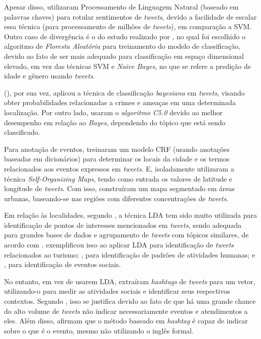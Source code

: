 \documentclass[
	12pt,				%
	oneside,			%
	a4paper,			%
	english,			%
	brazil				%
	]{abntex2ppgsi}
\begin{document}
{{{Apesar disso, \cite{Guo2016} utilizaram Processamento de Linguagem Natural (baseado em palavras chaves) para rotular sentimentos de \textit{tweets}, devido a facilidade de escalar essa técnica (para processamento de milhões de \textit{tweets}), em comparação a SVM. Outro caso de divergência é o do estudo realizado por \cite{Farseev2015}, no qual foi escolhido o algoritmo de \textit{Floresta Aleatória} para treinamento do modelo de classificação, devido ao fato de ser mais adequado para classificação em espaço dimensional elevado, em vez das técnicas SVM e \textit{Naive Bayes}, no que se refere a predição de idade e gênero usando \textit{tweets}.

\citeauthor{Mata2015} (\citeyear{Mata2015}), por sua vez, aplicou a técnica de classificação \textit{bayesiana} em \textit{tweets}, visando obter probabilidades relacionadas a crimes e ameaças em uma determinada localização. Por outro lado, \cite{Zagal2016} usaram o \textit{algoritmo C5.0} devido ao melhor desempenho em relação ao \textit{Bayes}, dependendo do tópico que está sendo classificado. 

Para anotação de eventos, \cite{Anantharam2015} treinaram um modelo CRF (usando anotações baseadas em dicionários) para determinar os locais da cidade e os termos relacionados aos eventos expressos em \textit{tweets}. E, isoladamente \cite{Frias-Martinez2014} utilizaram a técnica \textit{Self-Organizing Maps}, tendo como entrada os valores de latitude e longitude de \textit{tweets}. Com isso, construíram um mapa segmentado em áreas urbanas, baseando-se nas regiões com diferentes concentrações de \textit{tweets}.

Em relação às localidades, segundo \cite{Farseev2015}, a técnica LDA tem sido muito utilizada para identificação de pontos de interesses mencionados em \textit{tweets}, sendo adequada para grandes bases de dados e agrupamento de \textit{tweets} com tópicos similares, de acordo com \cite{Steiger2015Census}. \cite{Abbasi2015} exemplificou isso ao aplicar LDA para identificação de \textit{tweets} relacionados ao turismo; \cite{Hasan2014}, para identificação de padrões de atividades humanas; e \cite{DiLorenzo2013}, para identificação de eventos sociais.

No entanto, \cite{Ni2016} em vez de usarem LDA, extraíram \textit{hashtags} de \textit{tweets} para um vetor, utilizando-o para medir as atividades sociais e identificar seus respectivos contextos. Segundo \cite{Ni2016}, isso se justifica devido ao fato de que há uma grande chance do alto volume de \textit{tweets} não indicar necessariamente eventos e atendimentos a eles. Além disso, afirmam que o método baseado em \textit{hashtag} é capaz de indicar sobre o que é o evento, mesmo não utilizando o inglês formal.

}}}
\end{document}
